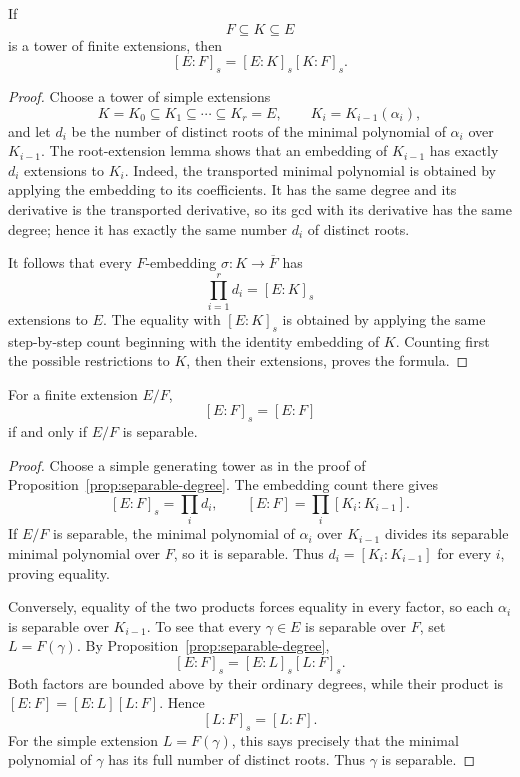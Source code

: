 \begin{proposition}\label{prop:separable-degree}
If
\[
F\subseteq K\subseteq E
\]
is a tower of finite extensions, then
\[
[E:F]_s=[E:K]_s[K:F]_s.
\]
\end{proposition}
\begin{proof}
Choose a tower of simple extensions
\[
K=K_0\subseteq K_1\subseteq\cdots\subseteq K_r=E,
\qquad K_i=K_{i-1}(\alpha_i),
\]
and let \(d_i\) be the number of distinct roots of the minimal polynomial
of \(\alpha_i\) over \(K_{i-1}\).  The root-extension lemma shows that an
embedding of \(K_{i-1}\) has exactly \(d_i\) extensions to \(K_i\).
Indeed, the transported minimal polynomial is obtained by applying the
embedding to its coefficients.  It has the same degree and its derivative
is the transported derivative, so its gcd with its derivative has the same
degree; hence it has exactly the same number \(d_i\) of distinct roots.

It follows that every \(F\)-embedding \(\sigma:K\to\overline F\) has
\[
\prod_{i=1}^r d_i=[E:K]_s
\]
extensions to \(E\).  The equality with \([E:K]_s\) is obtained by applying
the same step-by-step count beginning with the identity embedding of \(K\).
Counting first the possible restrictions to \(K\), then their extensions,
proves the formula.
\end{proof}

\begin{theorem}\label{thm:separable-degree}
For a finite extension \(E/F\),
\[
[E:F]_s=[E:F]
\]
if and only if \(E/F\) is separable.
\end{theorem}
\begin{proof}
Choose a simple generating tower as in the proof of
Proposition~\ref{prop:separable-degree}.  The embedding count there gives
\[
[E:F]_s=\prod_i d_i,
\qquad
[E:F]=\prod_i[K_i:K_{i-1}].
\]
If \(E/F\) is separable, the minimal polynomial of \(\alpha_i\) over
\(K_{i-1}\) divides its separable minimal polynomial over \(F\), so it is
separable.  Thus \(d_i=[K_i:K_{i-1}]\) for every \(i\), proving equality.

Conversely, equality of the two products forces equality in every factor,
so each \(\alpha_i\) is separable over \(K_{i-1}\).  To see that every
\(\gamma\in E\) is separable over \(F\), set \(L=F(\gamma)\).  By
Proposition~\ref{prop:separable-degree},
\[
[E:F]_s=[E:L]_s[L:F]_s.
\]
Both factors are bounded above by their ordinary degrees, while their
product is \([E:F]=[E:L][L:F]\).  Hence
\[
[L:F]_s=[L:F].
\]
For the simple extension \(L=F(\gamma)\), this says precisely that the
minimal polynomial of \(\gamma\) has its full number of distinct roots.
Thus \(\gamma\) is separable.
\end{proof}

